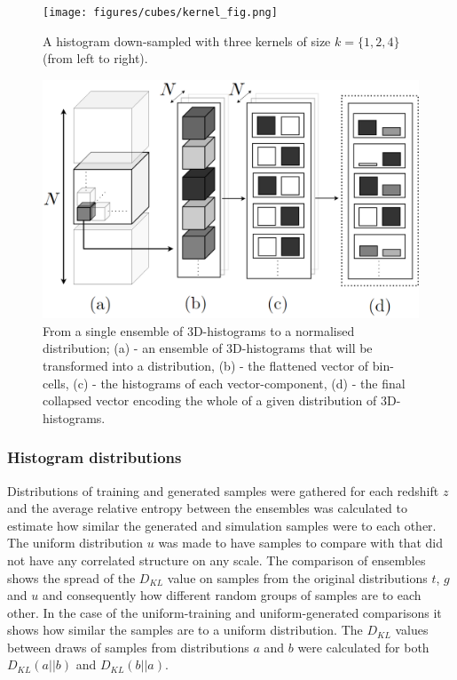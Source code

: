 \documentclass[twocolumn]{article}
\numberwithin{equation}{section}
\begin{document}
\begin{figure}[!ht]%
\texttt{[image: figures/cubes/kernel\_fig.png]}
\centering
\caption{A histogram down-sampled with three kernels of size $k=\{1, 2, 4\}$ (from left to right).}
\label{fig:kernel_fig}
\end{figure}

\begin{figure}
\includegraphics[width=\columnwidth]{figures/diagrams/kl_stat_process3.png}
\centering
\caption{From a single ensemble of 3D-histograms to a normalised distribution; 
         (a) - an ensemble of 3D-histograms that will be transformed into a distribution, 
         (b) - the flattened vector of bin-cells, 
         (c) - the histograms of each vector-component, 
         (d) - the final collapsed vector encoding the whole of a given distribution of 3D-histograms.}
\label{fig:klstat}
\end{figure}


\subsubsection{Histogram distributions}
Distributions of training and generated samples were gathered for each redshift $z$ and the average relative entropy 
between the ensembles was calculated to estimate how similar the generated and simulation samples were to each other.
The uniform distribution $u$ was made to have samples to compare with that did not have any correlated structure on any 
scale. The comparison of ensembles shows the spread of the $D_{KL}$ value on samples from the original distributions $t$, 
$g$ and $u$ and consequently how different random groups of samples are to each other. In the case of the uniform-training 
and uniform-generated comparisons it shows how similar the samples are to a uniform distribution. The $D_{KL}$ values 
between draws of samples from distributions $a$ and $b$ were calculated for both $D_{KL}(a||b)$ and $D_{KL}(b||a)$. 
\end{document}
